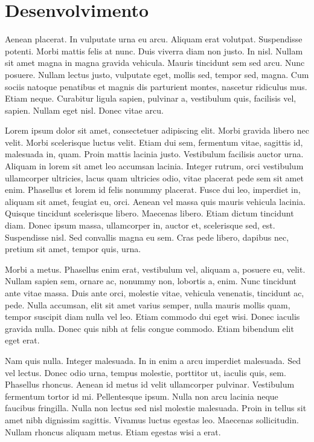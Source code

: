 \chapter{Desenvolvimento}

Aenean placerat. In vulputate urna eu arcu. Aliquam erat volutpat. Suspendisse potenti. Morbi mattis felis at nunc. Duis viverra diam non justo. In nisl. Nullam sit amet magna in magna gravida vehicula. Mauris tincidunt sem sed arcu. Nunc posuere. Nullam lectus justo, vulputate eget, mollis sed, tempor sed, magna. Cum sociis natoque penatibus et magnis dis parturient montes, nascetur ridiculus mus. Etiam neque. Curabitur ligula sapien, pulvinar a, vestibulum quis, facilisis vel, sapien. Nullam eget nisl. Donec vitae arcu.

Lorem ipsum dolor sit amet, consectetuer adipiscing elit. Morbi gravida libero nec velit. Morbi scelerisque luctus velit. Etiam dui sem, fermentum vitae, sagittis id, malesuada in, quam. Proin mattis lacinia justo. Vestibulum facilisis auctor urna. Aliquam in lorem sit amet leo accumsan lacinia. Integer rutrum, orci vestibulum ullamcorper ultricies, lacus quam ultricies odio, vitae placerat pede sem sit amet enim. Phasellus et lorem id felis nonummy placerat. Fusce dui leo, imperdiet in, aliquam sit amet, feugiat eu, orci. Aenean vel massa quis mauris vehicula lacinia. Quisque tincidunt scelerisque libero. Maecenas libero. Etiam dictum tincidunt diam. Donec ipsum massa, ullamcorper in, auctor et, scelerisque sed, est. Suspendisse nisl. Sed convallis magna eu sem. Cras pede libero, dapibus nec, pretium sit amet, tempor quis, urna.

Morbi a metus. Phasellus enim erat, vestibulum vel, aliquam a, posuere eu, velit. Nullam sapien sem, ornare ac, nonummy non, lobortis a, enim. Nunc tincidunt ante vitae massa. Duis ante orci, molestie vitae, vehicula venenatis, tincidunt ac, pede. Nulla accumsan, elit sit amet varius semper, nulla mauris mollis quam, tempor suscipit diam nulla vel leo. Etiam commodo dui eget wisi. Donec iaculis gravida nulla. Donec quis nibh at felis congue commodo. Etiam bibendum elit eget erat.

Nam quis nulla. Integer malesuada. In in enim a arcu imperdiet malesuada. Sed vel lectus. Donec odio urna, tempus molestie, porttitor ut, iaculis quis, sem. Phasellus rhoncus. Aenean id metus id velit ullamcorper pulvinar. Vestibulum fermentum tortor id mi. Pellentesque ipsum. Nulla non arcu lacinia neque faucibus fringilla. Nulla non lectus sed nisl molestie malesuada. Proin in tellus sit amet nibh dignissim sagittis. Vivamus luctus egestas leo. Maecenas sollicitudin. Nullam rhoncus aliquam metus. Etiam egestas wisi a erat.


